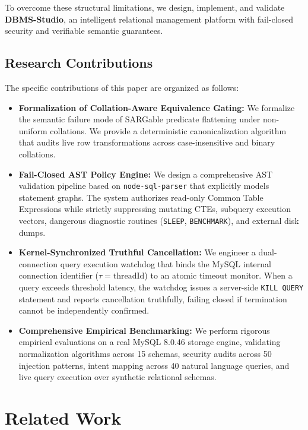 \documentclass[conference]{IEEEtran}
\begin{document}
To overcome these structural limitations, we design, implement, and validate \textbf{DBMS-Studio}, an intelligent relational management platform with fail-closed security and verifiable semantic guarantees.

\subsection{Research Contributions}
The specific contributions of this paper are organized as follows:
\begin{itemize}
    \item \textbf{Formalization of Collation-Aware Equivalence Gating:} We formalize the semantic failure mode of SARGable predicate flattening under non-uniform collations. We provide a deterministic canonicalization algorithm that audits live row transformations across case-insensitive and binary collations.
    \item \textbf{Fail-Closed AST Policy Engine:} We design a comprehensive AST validation pipeline based on \texttt{node-sql-parser} that explicitly models statement graphs. The system authorizes read-only Common Table Expressions while strictly suppressing mutating CTEs, subquery execution vectors, dangerous diagnostic routines (\texttt{SLEEP}, \texttt{BENCHMARK}), and external disk dumps.
    \item \textbf{Kernel-Synchronized Truthful Cancellation:} We engineer a dual-connection query execution watchdog that binds the MySQL internal connection identifier ($\tau = \text{threadId}$) to an atomic timeout monitor. When a query exceeds threshold latency, the watchdog issues a server-side \texttt{KILL QUERY} statement and reports cancellation truthfully, failing closed if termination cannot be independently confirmed.
    \item \textbf{Comprehensive Empirical Benchmarking:} We perform rigorous empirical evaluations on a real MySQL 8.0.46 storage engine, validating normalization algorithms across 15 schemas, security audits across 50 injection patterns, intent mapping across 40 natural language queries, and live query execution over synthetic relational schemas.
\end{itemize}

\section{Related Work}
\end{document}
